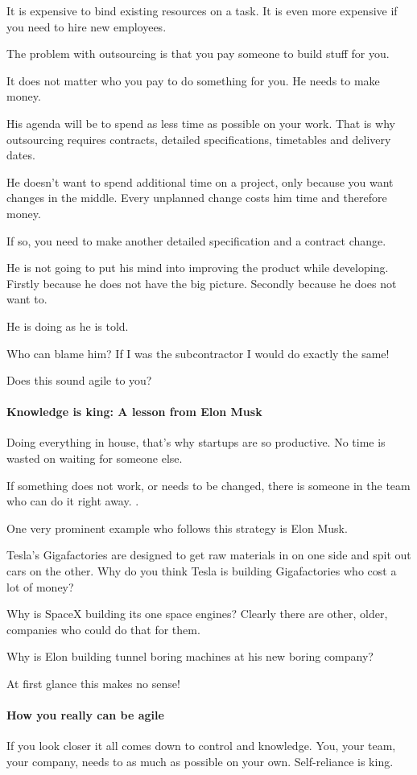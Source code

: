 \documentclass[12pt]{scrartcl} %
\begin{document}
It is expensive to bind existing resources on a task. It is even more expensive if you need to hire new employees.

The problem with outsourcing is that you pay someone to build stuff for you.

It does not matter who you pay to do something for you. He needs to make money.

His agenda will be to spend as less time as possible on your work. That is why outsourcing requires contracts, detailed specifications, timetables and delivery dates.

He doesn’t want to spend additional time on a project, only because you want changes in the middle. Every unplanned change costs him time and therefore money.

If so, you need to make another detailed specification and a contract change.

He is not going to put his mind into improving the product while developing. Firstly because he does not have the big picture. Secondly because he does not want to.

He is doing as he is told.

Who can blame him? If I was the subcontractor I would do exactly the same!

Does this sound agile to you?

\paragraph{Knowledge is king: A lesson from Elon Musk}
Doing everything in house, that’s why startups are so productive. No time is wasted on waiting for someone else.

If something does not work, or needs to be changed, there is someone in the team who can do it right away.                        .

One very prominent example who follows this strategy is Elon Musk.

Tesla’s Gigafactories are designed to get raw materials in on one side and spit out cars on the other. Why do you think Tesla is building Gigafactories who cost a lot of money?

Why is SpaceX building its one space engines? Clearly there are other, older, companies who could do that for them.

Why is Elon building tunnel boring machines at his new boring company?

At first glance this makes no sense!

\paragraph{How you really can be agile}
If you look closer it all comes down to control and knowledge. You, your team, your company, needs to as much as possible on your own. Self-reliance is king.
\end{document}
